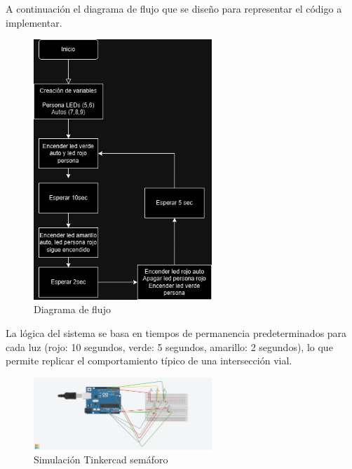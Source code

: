 \documentclass{article}
\begin{document}
A continuación el diagrama de flujo que se diseño para representar el código a implementar.

\begin{figure}[H]
    \centering
    \includegraphics[width=0.6\textwidth]{./img/flujo_semaforo.png}
    \caption{Diagrama de flujo}
    \label{fig:leds_secuenciales_flowchart}
\end{figure}

La lógica del sistema se basa en tiempos de permanencia predeterminados para cada luz (rojo: 10 segundos, verde: 5 segundos, amarillo: 2 segundos), lo que permite replicar el comportamiento típico de una intersección vial.

\begin{figure}[H]
    \centering
    \includegraphics[width=0.6\textwidth]{./img/simulacion_semaforo.png}
    \caption{Simulación Tinkercad semáforo}
    \label{fig:leds_secuenciales_flowchart}
\end{figure}
\end{document}
